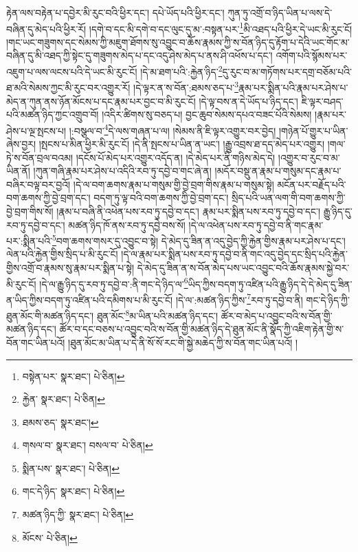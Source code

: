 རྟེན་ལས་བརྟེན་པ་དབྱེར་མི་རུང་བའི་ཕྱིར་དང་། དཔེ་ཡོད་པའི་ཕྱིར་དང་། ཀུན་ཏུ་འགྲོ་བ་ཉིད་ཡིན་པ་ལས་དེ་བཞིན་དུ་མེད་པའི་ཕྱིར་རོ། །དགེ་བ་དང་མི་དགེ་བ་དང་ལུང་དུ་མ་:བསྟན་པར་\footnote{བསྟེན་པར་  སྣར་ཐང་།  པེ་ཅིན། }མི་འཐད་པའི་ཕྱིར་དེ་ཡང་མི་རུང་ངོ། །གང་ཡང་གཟུགས་དང་སེམས་ཀྱི་མཇུག་ཐོགས་སུ་འབྱུང་བ་ཆོས་རྣམས་ཀྱི་ས་བོན་ཉིད་དུ་རྟོག་པ་དེའི་ཡང་གོང་མ་བཞིན་དུ་མི་འཐད་ཀྱི་སྟེང་དུ་གཟུགས་མེད་པ་དང་འདུ་ཤེས་མེད་པ་ནས་ཤི་འཕོས་པ་དང་། འགོག་པའི་སྙོམས་པར་འཇུག་པ་ལས་ལངས་པའི་དེ་ཡང་མི་རུང་ངོ། །དེ་མ་ཐག་པའི་:རྐྱེན་ཉིད་\footnote{རྐྱེན་  སྣར་ཐང་།  པེ་ཅིན། }དུ་རུང་བ་མ་གཏོགས་པར་དགྲ་བཅོམ་པའི་ཐ་མའི་སེམས་ཀྱང་མི་རུང་བར་འགྱུར་རོ། །དེ་ལྟར་ན་ས་བོན་:ཐམས་ཅད་པ་\footnote{ཐམས་ཅད་  སྣར་ཐང་། }རྣམ་པར་སྨིན་པའི་རྣམ་པར་ཤེས་པ་མེད་ན་ཀུན་ནས་ཉོན་མོངས་པ་དང་རྣམ་པར་བྱང་བ་མི་རུང་ངོ། །དེ་ལྟ་བས་ན་དེ་ཡོད་པ་ཉིད་དང་། ཇི་ལྟར་བཤད་པའི་མཚན་ཉིད་ཀྱང་འགྲུབ་བོ། །འདིར་ཚིགས་སུ་བཅད་པ། བྱང་ཆུབ་སེམས་དཔའ་བཟང་པོའི་སེམས། །རྣམ་པར་ཤེས་པ་ལྔ་སྤངས་པ། །:བསྩལ་བ་\footnote{གསལ་བ་  སྣར་ཐང་། བསལ་བ་  པེ་ཅིན། }དེ་ལས་གཞན་པ་ལ། །སེམས་ནི་ཇི་ལྟར་འགྱུར་བར་བྱེད། །གཉེན་པོ་གྱུར་པ་ཡིན་ཞེས་བྱར། །སྤངས་པ་མིན་ཕྱིར་མི་རུང་ངོ། །དེ་ནི་སྤངས་པ་ཡིན་ན་ཡང་། །རྒྱུ་འབྲས་ཐ་དད་མེད་པར་འགྱུར། །གལ་ཏེ་ས་བོན་བྲལ་བའམ། །དངོས་པོ་མེད་པར་འགྱུར་འདོད་ན། །དེ་མེད་པར་ནི་གཉིས་མེད་དེ། །འགྱུར་བ་རུང་བ་མ་ཡིན་ནོ། །ཀུན་གཞི་རྣམ་པར་ཤེས་པ་འདིའི་རབ་ཏུ་དབྱེ་བ་གང་ཞེ་ན། །མདོར་བསྡུ་ན་རྣམ་པ་གསུམ་དང་རྣམ་པ་བཞིར་བལྟ་བར་བྱའོ། །དེ་ལ་བག་ཆགས་རྣམ་པ་གསུམ་གྱི་བྱེ་བྲག་གིས་རྣམ་པ་གསུམ་སྟེ། མངོན་པར་བརྗོད་པའི་བག་ཆགས་ཀྱི་བྱེ་བྲག་དང་། བདག་ཏུ་ལྟ་བའི་བག་ཆགས་ཀྱི་བྱེ་བྲག་དང་། སྲིད་པའི་ཡན་ལག་གི་བག་ཆགས་ཀྱི་བྱེ་བྲག་གིས་སོ། །རྣམ་པ་བཞི་ནི་འཕེན་པས་རབ་ཏུ་དབྱེ་བ་དང་། རྣམ་པར་སྨིན་པས་རབ་ཏུ་དབྱེ་བ་དང་། རྒྱུ་ཉིད་དུ་རབ་ཏུ་དབྱེ་བ་དང་། མཚན་ཉིད་ཁོ་ནས་རབ་ཏུ་དབྱེ་བས་སོ། །དེ་ལ་འཕེན་པས་རབ་ཏུ་དབྱེ་བ་ནི་གང་རྣམ་པར་:སྨིན་པའི་\footnote{སྨིན་པས་  སྣར་ཐང་།  པེ་ཅིན། }བག་ཆགས་གསར་དུ་འབྱུང་བ་སྟེ། དེ་མེད་དུ་ཟིན་ན་འདུ་བྱེད་ཀྱི་རྐྱེན་གྱིས་རྣམ་པར་ཤེས་པ་དང་། ལེན་པའི་རྐྱེན་གྱིས་སྲིད་པ་མི་རུང་ངོ། །དེ་ལ་རྣམ་པར་སྨིན་པས་རབ་ཏུ་དབྱེ་བ་ནི་གང་འདུ་བྱེད་དང་སྲིད་པའི་རྐྱེན་གྱིས་འགྲོ་བ་རྣམས་སུ་རྣམ་པར་སྨིན་པ་སྟེ། དེ་མེད་དུ་ཟིན་ན་ས་བོན་མེད་པས་ཡང་འབྱུང་བའི་ཆོས་རྣམས་སྐྱེ་བར་མི་རུང་ངོ། །དེ་ལ་རྒྱུ་ཉིད་དུ་རབ་ཏུ་དབྱེ་བ་:ནི་གང་དེ་ཉིད་ལ་\footnote{གང་དེ་ཉིད་  སྣར་ཐང་།  པེ་ཅིན། }ཡིད་ཀྱིས་བདག་ཏུ་འཛིན་པའི་རྒྱུ་ཉིད་དེ་དེ་མེད་དུ་ཟིན་ན་ཡིད་ཀྱིས་བདག་ཏུ་འཛིན་པའི་དམིགས་པ་མི་རུང་ངོ། །དེ་ལ་:མཚན་ཉིད་ཀྱིས་\footnote{མཚན་ཉིད་ཀྱི་  སྣར་ཐང་།  པེ་ཅིན། }རབ་ཏུ་དབྱེ་བ་ནི། གང་དེ་ཉིད་ཀྱི་ཐུན་མོང་གི་མཚན་ཉིད་དང་། ཐུན་མོང་\footnote{མོངས་  པེ་ཅིན། }མ་ཡིན་པའི་མཚན་ཉིད་དང་། ཚོར་བ་མེད་པ་འབྱུང་བའི་ས་བོན་གྱི་མཚན་ཉིད་དང་། ཚོར་བ་དང་བཅས་པ་འབྱུང་བའི་ས་བོན་གྱི་མཚན་ཉིད་དེ་ཐུན་མོང་ནི་སྣོད་ཀྱི་འཇིག་རྟེན་གྱི་ས་བོན་གང་ཡིན་པའོ། །ཐུན་མོང་མ་ཡིན་པ་དེ་ནི་སོ་སོ་རང་གི་སྐྱེ་མཆེད་ཀྱི་ས་བོན་གང་ཡིན་པའོ། །
